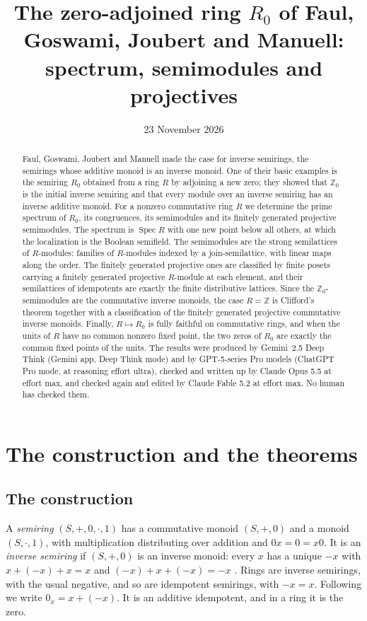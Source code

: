 \documentclass[11pt]{amsart}
\title[Spectrum, semimodules and projectives of $R_0$]{The zero-adjoined ring $R_0$ of Faul, Goswami, Joubert and Manuell: spectrum, semimodules and projectives}
\author{}
\date{23 November 2026}
\theoremstyle{remark}
\DeclareMathOperator{\Spec}{Spec}
\begin{document}
\begin{abstract}
Faul, Goswami, Joubert and Manuell made the case for inverse semirings, the semirings whose additive monoid is an inverse monoid. One of their basic examples is the semiring $R_0$ obtained from a ring $R$ by adjoining a new zero; they showed that $\mathbb Z_0$ is the initial inverse semiring and that every module over an inverse semiring has an inverse additive monoid. For a nonzero commutative ring $R$ we determine the prime spectrum of $R_0$, its congruences, its semimodules and its finitely generated projective semimodules. The spectrum is $\Spec R$ with one new point below all others, at which the localization is the Boolean semifield. The semimodules are the strong semilattices of $R$-modules: families of $R$-modules indexed by a join-semilattice, with linear maps along the order. The finitely generated projective ones are classified by finite posets carrying a finitely generated projective $R$-module at each element, and their semilattices of idempotents are exactly the finite distributive lattices. Since the $\mathbb Z_0$-semimodules are the commutative inverse monoids, the case $R=\mathbb Z$ is Clifford's theorem together with a classification of the finitely generated projective commutative inverse monoids. Finally, $R\mapsto R_0$ is fully faithful on commutative rings, and when the units of $R$ have no common nonzero fixed point, the two zeros of $R_0$ are exactly the common fixed points of the units. The results were produced by Gemini~2.5 Deep Think (Gemini app, Deep Think mode) and by GPT-5-series Pro models (ChatGPT Pro mode, at reasoning effort ultra), checked and written up by Claude Opus 5.5 at effort max, and checked again and edited by Claude Fable 5.2 at effort max. No human has checked them.
\end{abstract}

\maketitle

\section{The construction and the theorems}

\subsection{The construction}
A \emph{semiring} $(S,+,0,\cdot,1)$ has a commutative monoid $(S,+,0)$ and a monoid $(S,\cdot,1)$, with multiplication distributing over addition and $0x=0=x0$. It is an \emph{inverse semiring} if $(S,+,0)$ is an inverse monoid: every $x$ has a unique $-x$ with $x+(-x)+x=x$ and $(-x)+x+(-x)=-x$ \cite[\S1]{FGJM}. Rings are inverse semirings, with the usual negative, and so are idempotent semirings, with $-x=x$. Following \cite{FGJM} we write $0_x=x+(-x)$. It is an additive idempotent, and in a ring it is the zero.
\end{document}
